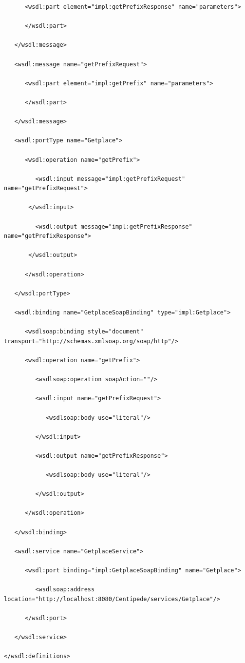 \documentclass[conference]{IEEEtran}
\begin{document}
\begin{verbatim}
      <wsdl:part element="impl:getPrefixResponse" name="parameters">

      </wsdl:part>

   </wsdl:message>

   <wsdl:message name="getPrefixRequest">

      <wsdl:part element="impl:getPrefix" name="parameters">

      </wsdl:part>

   </wsdl:message>

   <wsdl:portType name="Getplace">

      <wsdl:operation name="getPrefix">

         <wsdl:input message="impl:getPrefixRequest" name="getPrefixRequest">

       </wsdl:input>

         <wsdl:output message="impl:getPrefixResponse" name="getPrefixResponse">

       </wsdl:output>

      </wsdl:operation>

   </wsdl:portType>

   <wsdl:binding name="GetplaceSoapBinding" type="impl:Getplace">

      <wsdlsoap:binding style="document" transport="http://schemas.xmlsoap.org/soap/http"/>

      <wsdl:operation name="getPrefix">

         <wsdlsoap:operation soapAction=""/>

         <wsdl:input name="getPrefixRequest">

            <wsdlsoap:body use="literal"/>

         </wsdl:input>

         <wsdl:output name="getPrefixResponse">

            <wsdlsoap:body use="literal"/>

         </wsdl:output>

      </wsdl:operation>

   </wsdl:binding>

   <wsdl:service name="GetplaceService">

      <wsdl:port binding="impl:GetplaceSoapBinding" name="Getplace">

         <wsdlsoap:address location="http://localhost:8080/Centipede/services/Getplace"/>

      </wsdl:port>

   </wsdl:service>

</wsdl:definitions>



\end{verbatim}
\end{document}
